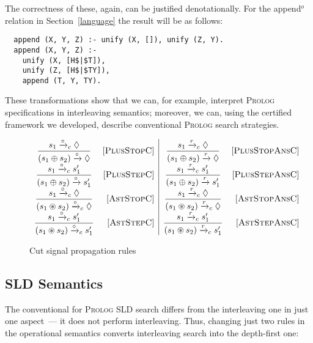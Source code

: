 The correctness of these, again, can be justified denotationally. For the append$^o$ relation in Section~\ref{language} the result
will be as follows:

\begin{lstlisting}
  append (X, Y, Z) :- unify (X, []), unify (Z, Y).
  append (X, Y, Z) :-
    unify (X, [H$|$T]),
    unify (Z, [H$|$TY]),
    append (T, Y, TY).
\end{lstlisting}

These transformations show that we can, for example, interpret \textsc{Prolog} specifications in interleaving semantics; moreover, we can,
using the certified framework we developed, describe conventional \textsc{Prolog} search strategies.

\begin{figure*}
\[
\begin{array}{cr|cr}
  \dfrac{s_1 \xrightarrow{\circ}_c \Diamond}{(s_1 \oplus s_2) \xrightarrow{\circ} \Diamond} & \mbox{[\textsc{PlusStopC}]}&
  \dfrac{s_1 \xrightarrow{r}_c \Diamond}{(s_1 \oplus s_2) \xrightarrow{r} \Diamond} & \mbox{[\textsc{PlusStopAnsC}]}\\
  \dfrac{s_1 \xrightarrow{\circ}_c s'_1}{(s_1 \oplus s_2) \xrightarrow{\circ} s'_1} &\mbox{[\textsc{PlusStepC}]}&
  \dfrac{s_1 \xrightarrow{r}_c s'_1}{(s_1 \oplus s_2) \xrightarrow{r} s'_1} &\mbox{[\textsc{PlusStepAnsC}]}\\
  \dfrac{s_1 \xrightarrow{\circ}_c \Diamond}{(s_1 \circledast s_2) \xrightarrow{\circ}_c \Diamond} & \mbox{[\textsc{AstStopC}]}&
  \dfrac{s_1 \xrightarrow{r}_c \Diamond}{(s_1 \circledast s_2) \xrightarrow{r}_c \Diamond} & \mbox{[\textsc{AstStopAnsC}]}\\
  \dfrac{s_1 \xrightarrow{\circ}_c s'_1}{(s_1 \circledast s_2) \xrightarrow{\circ}_c s'_1} &\mbox{[\textsc{AstStepC}]}&
  \dfrac{s_1 \xrightarrow{r}_c s'_1}{(s_1 \circledast s_2) \xrightarrow{r}_c s'_1} &\mbox{[\textsc{AstStepAnsC}]}
\end{array}
\]
\caption{Cut signal propagation rules}
\label{cut-signal-propagation}
\end{figure*}

\subsection{SLD Semantics}

The conventional for \textsc{Prolog} SLD search differs from the interleaving one in just one aspect~--- it does not perform interleaving.
Thus, changing just two rules in the operational semantics converts interleaving search into the depth-first one:

